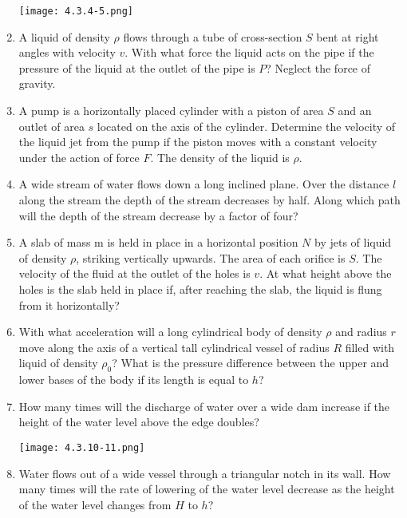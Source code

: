 \documentclass{article}
\begin{document}
\begin{enumerate}[label=4.3.\arabic*]
\begin{center}
    \texttt{[image: 4.3.4-5.png]}
\end{center}


\item A liquid of density $\rho$ flows through a tube of cross-section $S$ bent at right angles with velocity $v$. With what force the liquid acts on the pipe if the pressure of the liquid at the outlet of the pipe is $P$? Neglect the force of gravity.

\item A pump is a horizontally placed cylinder with a piston of area $S$ and an outlet of area $s$ located on the axis of the cylinder. Determine the velocity of the liquid jet from the pump if the piston moves with a constant velocity under the action of force $F$. The density of the liquid is $\rho$.

\item A wide stream of water flows down a long inclined plane. Over the distance $l$ along the stream the depth of the stream decreases by half. Along which path will the depth of the stream decrease by a factor of four?

\item A slab of mass m is held in place in a horizontal position $N$ by jets of liquid of density $\rho$, striking vertically upwards. The area of each orifice is $S$. The velocity of the fluid at the outlet of the holes is $v$. At what height above the holes is the slab held in place if, after reaching the slab, the liquid is flung from it horizontally?   

\item With what acceleration will a long cylindrical body of density $\rho$ and radius $r$ move along the axis of a vertical tall cylindrical vessel of radius $R$ filled with liquid of density $\rho_0$? What is the pressure difference between the upper and lower bases of the body if its length is equal to $h$?

\item How many times will the discharge of water over a wide dam increase if the height of the water level above the edge doubles?   

\begin{center}
    \texttt{[image: 4.3.10-11.png]}
\end{center}

\item Water flows out of a wide vessel through a triangular notch in its wall. How many times will the rate of lowering of the water level decrease as the height of the water level changes from $H$ to $h$?   


\end{enumerate}
\end{document}
